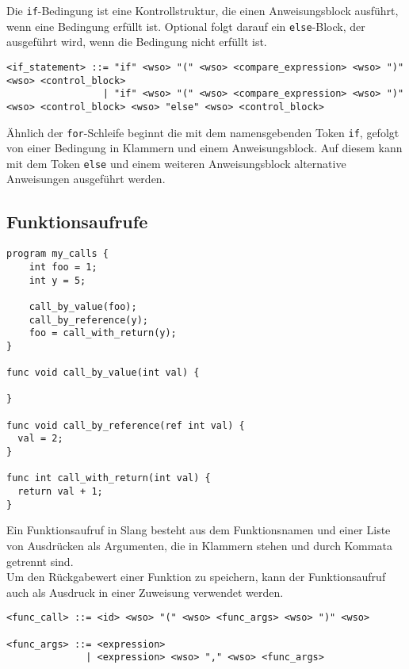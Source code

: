 Die \texttt{if}-Bedingung ist eine Kontrollstruktur, die einen Anweisungsblock ausführt, wenn eine Bedingung erfüllt ist.
Optional folgt darauf ein \texttt{else}-Block, der ausgeführt wird, wenn die Bedingung nicht erfüllt ist.\\

\begin{lstlisting}
<if_statement> ::= "if" <wso> "(" <wso> <compare_expression> <wso> ")" <wso> <control_block>
                 | "if" <wso> "(" <wso> <compare_expression> <wso> ")"  <wso> <control_block> <wso> "else" <wso> <control_block>
\end{lstlisting}

Ähnlich der \texttt{for}-Schleife beginnt die mit dem namensgebenden Token \texttt{if}, gefolgt von einer Bedingung in Klammern und einem Anweisungsblock.
Auf diesem kann mit dem Token \texttt{else} und einem weiteren Anweisungsblock alternative Anweisungen ausgeführt werden.

\subsection{Funktionsaufrufe}

\begin{lstlisting}
program my_calls {
    int foo = 1;
    int y = 5;
    
    call_by_value(foo);
    call_by_reference(y);
    foo = call_with_return(y);
}

func void call_by_value(int val) {
  
}

func void call_by_reference(ref int val) {
  val = 2;
}

func int call_with_return(int val) {
  return val + 1;
}
\end{lstlisting}

Ein Funktionsaufruf in Slang besteht aus dem Funktionsnamen und einer Liste von Ausdrücken als Argumenten, die in Klammern stehen und durch Kommata getrennt sind.\\
Um den Rückgabewert einer Funktion zu speichern, kann der Funktionsaufruf auch als Ausdruck in einer Zuweisung verwendet werden.\\

\begin{lstlisting}
<func_call> ::= <id> <wso> "(" <wso> <func_args> <wso> ")" <wso>

<func_args> ::= <expression>
              | <expression> <wso> "," <wso> <func_args>
\end{lstlisting}

